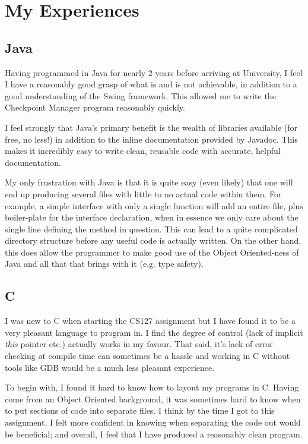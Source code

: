 \documentclass[a4paper, twoside]{article}
\begin{document}
\section{My Experiences}
\subsection{Java}
Having programmed in Java for nearly 2 years before arriving at University, I
feel I have a reasonably good grasp of what is and is not achievable, in
addition to a good understanding of the Swing framework. This allowed me to
write the Checkpoint Manager program reasonably quickly.

I feel strongly that Java's primary benefit is the wealth of libraries available
(for free, no less!) in addition to the inline documentation provided by
Javadoc. This makes it incredibly easy to write clean, reusable code with
accurate, helpful documentation.

My only frustration with Java is that it is quite easy (even likely) that one
will end up producing several files with little to no actual code within them.
For example, a simple interface with only a single function will add an entire
file, plus boiler-plate for the interface declaration, when in essence we only
care about the single line defining the method in question. This can lead to
a quite complicated directory structure before any useful code is actually
written. On the other hand, this does allow the programmer to make good use of
the Object Oriented-ness of Java and all that that brings with it (e.g. type
safety).

\subsection{C}
I was new to C when starting the CS127 assignment but I have found it to be a
very pleasant language to program in. I find the degree of control (lack of
implicit {\em this} pointer etc.) actually works in my favour. That said, it's lack of
error checking at compile time can sometimes be a hassle and working in C
without tools like GDB would be a much less pleasant experience.

To begin with, I found it hard to know how to layout my programs in C. Having
come from an Object Oriented background, it was sometimes hard to know when to
put sections of code into separate files. I think by the time I got to this
assignment, I felt more confident in knowing when separating the code out would
be beneficial; and overall, I feel that I have produced a reasonably clean
program.
\end{document}
